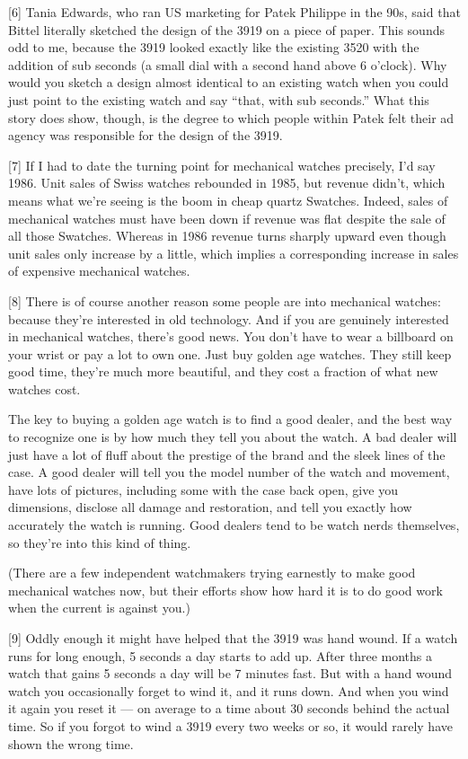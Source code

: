 {[}6{]} Tania Edwards, who ran US marketing for Patek Philippe in the
90s, said that Bittel literally sketched the design of the 3919 on a
piece of paper. This sounds odd to me, because the 3919 looked exactly
like the existing 3520 with the addition of sub seconds (a small dial
with a second hand above 6 o'clock). Why would you sketch a design
almost identical to an existing watch when you could just point to the
existing watch and say ``that, with sub seconds.'' What this story does
show, though, is the degree to which people within Patek felt their ad
agency was responsible for the design of the 3919.

{[}7{]} If I had to date the turning point for mechanical watches
precisely, I'd say 1986. Unit sales of Swiss watches rebounded in 1985,
but revenue didn't, which means what we're seeing is the boom in cheap
quartz Swatches. Indeed, sales of mechanical watches must have been down
if revenue was flat despite the sale of all those Swatches. Whereas in
1986 revenue turns sharply upward even though unit sales only increase
by a little, which implies a corresponding increase in sales of
expensive mechanical watches.

{[}8{]} There is of course another reason some people are into
mechanical watches: because they're interested in old technology. And if
you are genuinely interested in mechanical watches, there's good news.
You don't have to wear a billboard on your wrist or pay a lot to own
one. Just buy golden age watches. They still keep good time, they're
much more beautiful, and they cost a fraction of what new watches cost.

The key to buying a golden age watch is to find a good dealer, and the
best way to recognize one is by how much they tell you about the watch.
A bad dealer will just have a lot of fluff about the prestige of the
brand and the sleek lines of the case. A good dealer will tell you the
model number of the watch and movement, have lots of pictures, including
some with the case back open, give you dimensions, disclose all damage
and restoration, and tell you exactly how accurately the watch is
running. Good dealers tend to be watch nerds themselves, so they're into
this kind of thing.

(There are a few independent watchmakers trying earnestly to make good
mechanical watches now, but their efforts show how hard it is to do good
work when the current is against you.)

{[}9{]} Oddly enough it might have helped that the 3919 was hand wound.
If a watch runs for long enough, 5 seconds a day starts to add up. After
three months a watch that gains 5 seconds a day will be 7 minutes fast.
But with a hand wound watch you occasionally forget to wind it, and it
runs down. And when you wind it again you reset it --- on average to a
time about 30 seconds behind the actual time. So if you forgot to wind a
3919 every two weeks or so, it would rarely have shown the wrong time.

